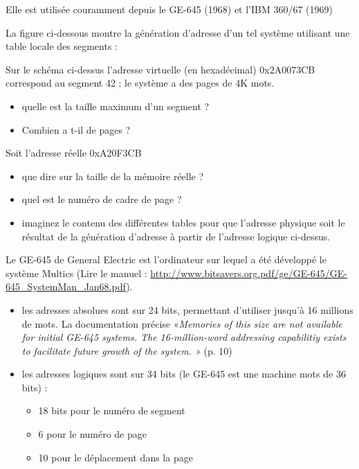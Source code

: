 \begin{multicols}{2}
Elle est utilisée couramment depuis le GE-645 (1968)  et l'IBM 360/67 (1969)

La figure ci-dessous montre la génération d'adresse d'un tel système utilisant une table locale des segments :


\begin{exercice}
Sur le schéma ci-dessus l'adresse virtuelle (en hexadécimal) 0x2A0073CB correspond au segment 42 ; le système a des pages de 4K mots. 
\begin{itemize}
\item quelle est la taille maximum d'un segment ?  
\item Combien a t-il de pages ?
\end{itemize}
Soit  l'adresse réelle 0xA20F3CB
\begin{itemize}
\item que dire sur la taille de la mémoire réelle ?
\item quel est le numéro de cadre de page ?
\item imaginez le contenu des différentes tables pour que l'adresse physique soit le résultat de la génération d'adresse à partir de l'adresse logique ci-dessus.
\end{itemize}
\end{exercice}


Le GE-645 de General Electric est l'ordinateur sur lequel a été développé le système 
Multics (Lire le manuel : \url{http://www.bitsavers.org.pdf/ge/GE-645/GE-645_SystemMan_Jan68.pdf}).

\begin{itemize}
\item les adresses absolues sont sur 24 bits, permettant d'utiliser
  jusqu'à 16 millions de mots. La documentation précise
  «\emph{Memories of this size are not available for initial GE-645
      systems. The 16-million-word addressing capabilitiy exists to
      facilitate future growth of the system. »} (p. 10)
\item les adresses logiques sont sur 34 bits (le GE-645 est une
  machine mots de 36 bits) : 
\begin{itemize}
\item 
18 bits pour le numéro de segment 
\item  6
  pour le numéro de page 
\item  10 pour le déplacement dans la page
\end{itemize}
\end{itemize}


\end{multicols}
